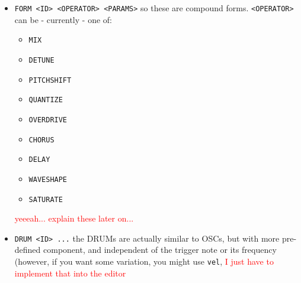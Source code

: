 \documentclass[11pt]{article}
\begin{document}
\begin{itemize}
    \item \texttt{FORM <ID> <OPERATOR> <PARAMS>}
      so these are compound forms. \texttt{<OPERATOR>} can be - currently - one of:
      \begin{itemize}
        \item \texttt{MIX}
        \item \texttt{DETUNE}
        \item \texttt{PITCHSHIFT}
        \item \texttt{QUANTIZE}
        \item \texttt{OVERDRIVE}
        \item \texttt{CHORUS}
        \item \texttt{DELAY}
        \item \texttt{WAVESHAPE}
        \item \texttt{SATURATE}
      \end{itemize}
      \textcolor{red}{yeeeah... explain these later on...}
      
      \item \texttt{DRUM <ID> ...}
      the DRUMs are actually similar to OSCs, but with more pre-defined component, and independent of the trigger note or its frequency (however, if you want some variation, you might use \texttt{vel}, \textcolor{red}{I just have to implement that into the editor}
  \end{itemize}
  
\end{document}
